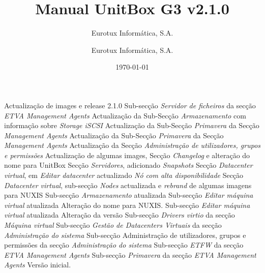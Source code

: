 \documentclass[12pt,a4paper,portuges]{scrreprt}
\author{Eurotux Informática, S.A.}
\title{Manual UnitBox G3 v2.1.0}
\subtitle{Eurotux Informática, S.A.}
\date{\today}
\begin{document}
\maketitle

\begin{Log}
Actualização de images e release 2.1.0
Sub-secção \textit{Servidor de ficheiros} da secção \textit{ETVA Management Agents}
Actualização da Sub-Secção \textit{Armazenamento} com informação sobre \emph{Storage iSCSI}
Actualização da Sub-Secção \textit{Primavera} da Secção \textit{Management Agents}
Actualização da Sub-Secção \textit{Primavera} da Secção \textit{Management Agents}
Actualização da Secção \textit{Administração de utilizadores, grupos e permissões}
Actualização de algumas images, Secção \textit{Changelog} e alteração do nome para UnitBox
Secção \textit{Servidores}, adicionado \textit{Snapshots}
Secção \textit{Datacenter virtual}, em \textit{Editar datacenter} actualizado \textit{Nó com alta disponibilidade }
Secção \textit{Datacenter virtual}, sub-secção \textit{Nodes} actualizada e \textit{rebrand} de algumas imagens para NUXIS
Sub-secção \textit{Armazenamento} atualizada
Sub-secção \textit{Editar máquina virtual} atualizada
Alteração do nome para NUXIS. Sub-secção \textit{Editar máquina virtual} atualizada
Alteração da versão
Sub-secção \textit{Drivers virtio} da secção \textit{Máquina virtual}
Sub-secção \textit{Gestão de Datacenters Virtuais} da secção \textit{Administração do sistema}
Sub-secção Administração de utilizadores, grupos e permissões da secção \textit{Administração do sistema}
Sub-secção \textit{ETFW} da secção \textit{ETVA Management Agents}
Sub-secção \textit{Primavera} da secção \textit{ETVA Management Agents}
Versão inicial.
\end{Log}

\tableofcontents

\listoffigures


%
%




\end{document}
